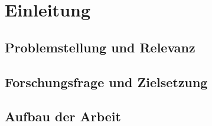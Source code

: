 \chapter{Einleitung}\label{chap:einleitung}

\section{Problemstellung und Relevanz}\label{sec:problem}

\section{Forschungsfrage und Zielsetzung}\label{sec:ziel}

\section{Aufbau der Arbeit}\label{sec:aufbau}
